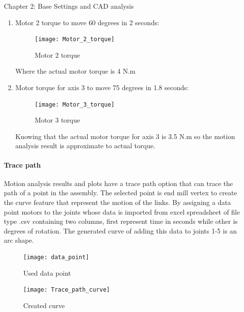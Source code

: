 \documentclass{book}
\begin{document}
\begin{chapter}{Chapter 2: Base Settings and CAD analysis}
\begin{enumerate}
	\smallskip
Knowing that the actual motor torque for axis 1 is 4.5 N.m so the motion analysis result is approximate to actual torque. 
\newline Motor torque vary with time because of the motion of the links beyond the motor which has an effect on the torque by changing the loads carried by the motor.
\smallskip
	\item Motor 2 torque to move 60 degrees in 2 seconds:
	\begin{figure}[H]
		\centering
		\texttt{[image: Motor\_2\_torque]}
		\caption{Motor 2 torque}
	\end{figure}
	
	Where the actual motor torque is 4 N.m

\smallskip
	\item Motor torque for axis 3 to move 75 degrees in 1.8 seconds:
	\begin{figure}[H]
		\centering
		\texttt{[image: Motor\_3\_torque]}
		\caption{Motor 3 torque}
	\end{figure}
	
	Knowing that the actual motor torque for axis 3 is 3.5 N.m so the motion analysis result is approximate to actual torque.
\end{enumerate}

\bigskip
\paragraph{Trace path}
Motion analysis results and plots have a trace path option that can trace the path of a point in the assembly. The selected point is end mill vertex to create the curve feature that represent the motion of the links.  By assigning a data point motors to the joints whose data is imported from excel spreadsheet of file type .csv containing two columns, first represent time in seconds while other is degrees of rotation. The generated curve of adding this data to joints 1-5 is an arc shape.

\begin{figure}[H]
	\centering
	\texttt{[image: data\_point]}
	\caption{Used data point}
\end{figure}

\begin{figure}[H]
	\centering
	\texttt{[image: Trace\_path\_curve]}
	\caption{Created curve}
\end{figure}


\end{chapter}
    
\end{document}
